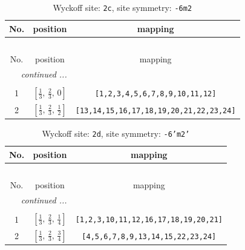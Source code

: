 \documentclass[fleqn,8pt]{jsarticle}
\begin{document}
\renewcommand{\arraystretch}{1.2}
\begin{longtable}{ccc}
\caption{Wyckoff site: {\tt 2c}, site symmetry: {\tt -6m2}}
 \\
 \hline \hline
No. & position & mapping \\ \hline \endfirsthead

\multicolumn{2}{l}{\tablename\ \thetable{}} \\
 \hline \hline
No. & position & mapping \\ \hline \endhead

 \hline \hline
\multicolumn{2}{r}{\footnotesize\it continued ...} \\ \endfoot

 \hline \hline
\multicolumn{2}{r}{} \\ \endlastfoot

1 & $\left[ \frac{1}{3},\, \frac{2}{3},\, 0 \right]$ & {\tt [1,2,3,4,5,6,7,8,9,10,11,12]} \\ \hline
2 & $\left[ \frac{1}{3},\, \frac{2}{3},\, \frac{1}{2} \right]$ & {\tt [13,14,15,16,17,18,19,20,21,22,23,24]} \\
\end{longtable}
\renewcommand{\arraystretch}{1.2}
\begin{longtable}{ccc}
\caption{Wyckoff site: {\tt 2d}, site symmetry: {\tt -6'm2'}}
 \\
 \hline \hline
No. & position & mapping \\ \hline \endfirsthead

\multicolumn{2}{l}{\tablename\ \thetable{}} \\
 \hline \hline
No. & position & mapping \\ \hline \endhead

 \hline \hline
\multicolumn{2}{r}{\footnotesize\it continued ...} \\ \endfoot

 \hline \hline
\multicolumn{2}{r}{} \\ \endlastfoot

1 & $\left[ \frac{1}{3},\, \frac{2}{3},\, \frac{1}{4} \right]$ & {\tt [1,2,3,10,11,12,16,17,18,19,20,21]} \\ \hline
2 & $\left[ \frac{1}{3},\, \frac{2}{3},\, \frac{3}{4} \right]$ & {\tt [4,5,6,7,8,9,13,14,15,22,23,24]} \\
\end{longtable}
\renewcommand{\arraystretch}{1.2}
\end{document}
